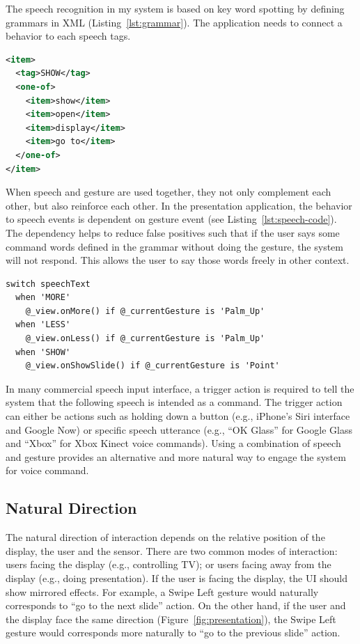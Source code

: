 The speech recognition in my system is based on key word spotting by defining
grammars in XML (Listing~\ref{lst:grammar}). The application needs to
connect a behavior to each speech tags.

\begin{lstlisting}[caption={An example of grammar definition in XML.},
language=XML, label={lst:grammar}] 
<item>
  <tag>SHOW</tag>
  <one-of>
    <item>show</item>
    <item>open</item>
    <item>display</item>
    <item>go to</item>
  </one-of>
</item>
\end{lstlisting}

When speech and gesture are used together, they not only complement each
other, but also reinforce each other. In the 
presentation application, the behavior to speech events is dependent on gesture
event (see Listing~\ref{lst:speech-code}). The dependency helps to reduce false
positives such that if the user says some command words defined in the grammar 
without doing the gesture, the system will not respond. This allows the user to
say those words freely in other context.

\begin{lstlisting}[caption={Code for speech events in CoffeeScript.},
label={lst:speech-code}] switch speechText
  when 'MORE'
    @_view.onMore() if @_currentGesture is 'Palm_Up'
  when 'LESS'
    @_view.onLess() if @_currentGesture is 'Palm_Up'
  when 'SHOW'
    @_view.onShowSlide() if @_currentGesture is 'Point'
\end{lstlisting}

In many commercial speech input interface, a trigger action is required to tell
the system that the following speech is intended as a command. The trigger
action can either be actions such as holding down a button (e.g., iPhone's
Siri interface and Google Now) or specific speech utterance (e.g., ``OK Glass''
for Google Glass and ``Xbox'' for Xbox Kinect voice commands). Using a
combination of speech and gesture provides an alternative and more natural way
to engage the system for voice command.

\subsection{Natural Direction}
The natural direction of interaction depends on the relative position of the
display, the user and the sensor. There are two common modes of interaction:
users facing the display (e.g., controlling TV); or users facing away from the
display (e.g., doing presentation). If the user is facing the display, the UI should show mirrored
effects.
For example, a Swipe Left gesture would naturally corresponds to ``go to the next slide'' action. On the other hand, if
the user and the display face the same direction
(Figure~\ref{fig:presentation}), the Swipe Left gesture would corresponds more
naturally to ``go to the previous slide'' action.

